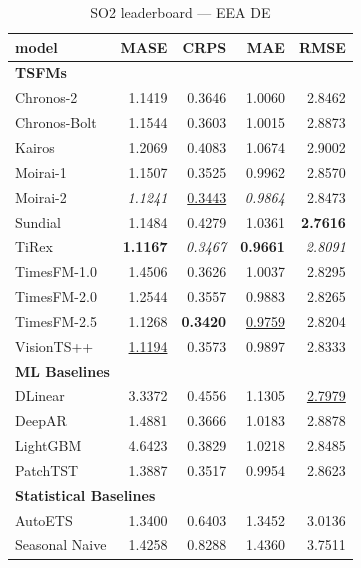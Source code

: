 \begin{table}[H]
\caption{SO2 leaderboard --- EEA DE}
\centering
\begin{small}
\begin{tabular}{lrrrr}
\toprule
model & MASE & CRPS & MAE & RMSE \\
\midrule
\multicolumn{5}{l}{\textbf{TSFMs}} \\
Chronos-2 & 1.1419 & 0.3646 & 1.0060 & 2.8462 \\
Chronos-Bolt & 1.1544 & 0.3603 & 1.0015 & 2.8873 \\
Kairos & 1.2069 & 0.4083 & 1.0674 & 2.9002 \\
Moirai-1 & 1.1507 & 0.3525 & 0.9962 & 2.8570 \\
Moirai-2 & \textit{1.1241} & \underline{0.3443} & \textit{0.9864} & 2.8473 \\
Sundial & 1.1484 & 0.4279 & 1.0361 & \textbf{2.7616} \\
TiRex & \textbf{1.1167} & \textit{0.3467} & \textbf{0.9661} & \textit{2.8091} \\
TimesFM-1.0 & 1.4506 & 0.3626 & 1.0037 & 2.8295 \\
TimesFM-2.0 & 1.2544 & 0.3557 & 0.9883 & 2.8265 \\
TimesFM-2.5 & 1.1268 & \textbf{0.3420} & \underline{0.9759} & 2.8204 \\
VisionTS++ & \underline{1.1194} & 0.3573 & 0.9897 & 2.8333 \\
\midrule
\multicolumn{5}{l}{\textbf{ML Baselines}} \\
DLinear & 3.3372 & 0.4556 & 1.1305 & \underline{2.7979} \\
DeepAR & 1.4881 & 0.3666 & 1.0183 & 2.8878 \\
LightGBM & 4.6423 & 0.3829 & 1.0218 & 2.8485 \\
PatchTST & 1.3887 & 0.3517 & 0.9954 & 2.8623 \\
\midrule
\multicolumn{5}{l}{\textbf{Statistical Baselines}} \\
AutoETS & 1.3400 & 0.6403 & 1.3452 & 3.0136 \\
Seasonal Naive & 1.4258 & 0.8288 & 1.4360 & 3.7511 \\
\bottomrule
\end{tabular}
\end{small}
\end{table}